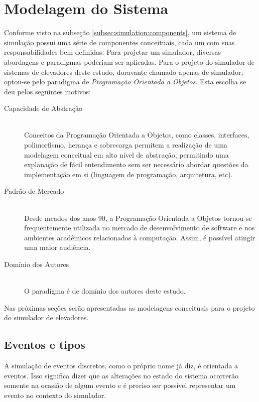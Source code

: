 \chapter{\label{chap:modeling}Modelagem do Sistema}

Conforme visto na subseção \ref{subsec:simulation:components}, um sistema de
simulação possui uma série de componentes conceituais, cada um com suas
responsabilidades bem definidas. Para projetar um simulador, diversas abordagens
e paradigmas poderiam ser aplicadas. Para o projeto do simulador de sistemas de
elevadores deste estudo, doravante chamado apenas de simulador, optou-se pelo
paradigma de \textit{Programação Orientada a Objetos}. Esta escolha se deu pelos
seguintes motivos:

\begin{description}
  \item[Capacidade de Abstração]\hfill \\
    Conceitos da Programação Orientada a Objetos, como classes, interfaces,
    polimorfismo, herança e sobrecarga permitem a realização de uma modelagem
    conceitual em alto nível de abstração, permitindo uma explanação de fácil
    entendimento sem ser necessário abordar questões da implementação em si
    (linguagem de programação, arquitetura, etc).
  \item[Padrão de Mercado]\hfill \\
    Desde meados dos anos 90, a Programação Orientada a Objetos tornou-se
    frequentemente utilizada no mercado de desenvolvimento de software e nos
    ambientes acadêmicos relacionados à computação. Assim, é possível atingir
    uma maior audiência.
  \item[Domínio dos Autores]\hfill \\
    O paradigma é de domínio dos autores deste estudo.
\end{description}

Nas próximas seções serão apresentadas as modelagens conceituais para o projeto
do simulador de elevadores.

\section{\label{sec:eventos-e-tipos}Eventos e tipos}

A simulação de eventos discretos, como o próprio nome já diz, é orientada a
eventos. Isso significa dizer que as alterações no estado do sistema ocorrerão
somente na ocasião de algum evento e é preciso ser possível representar um
evento no contexto do simulador.

